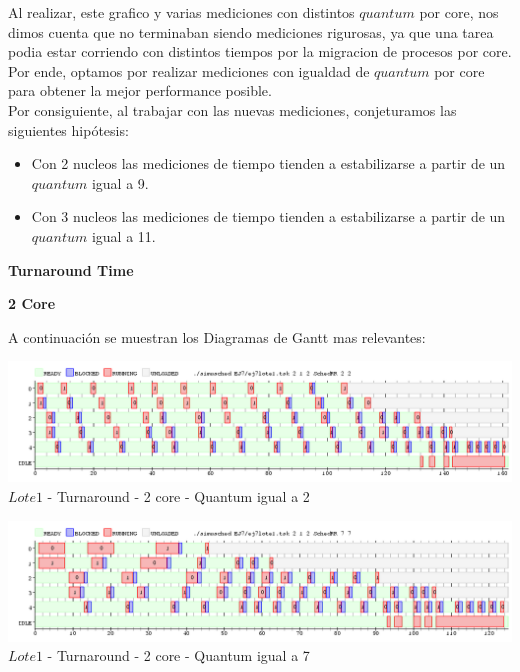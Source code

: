 \indent Al realizar, este grafico y varias mediciones con distintos $quantum$ por core, nos dimos cuenta que no terminaban
siendo mediciones rigurosas, ya que una tarea podia estar corriendo con distintos tiempos por la migracion de procesos por core.\\
\indent Por ende, optamos por realizar mediciones con igualdad de $quantum$ por core para obtener la mejor performance posible.\\
 
 \indent Por consiguiente, al trabajar con las nuevas mediciones, conjeturamos las siguientes hipótesis:
 
 \begin{itemize}
  \item Con 2 nucleos las mediciones de tiempo tienden a estabilizarse a partir de un $quantum$ igual a 9.
  \item Con 3 nucleos las mediciones de tiempo tienden a estabilizarse a partir de un $quantum$ igual a 11.
 \end{itemize}
 \begin{center}
 \textbf{Turnaround Time} 
  \end{center}

 \begin{center}
 \textbf{2 Core}
 \end{center}
  A continuación se muestran los Diagramas de Gantt mas relevantes:
  
  \begin{center}
    	\includegraphics[width=450pt]{./EJ7/ej7tour2core1quan.png}
	{$Lote 1$ - Turnaround - 2 core - Quantum igual a 2}	
 \end{center}

   \begin{center}
    	\includegraphics[width=450pt]{./EJ7/ej7tour2core3quan.png}
	{$Lote 1$ - Turnaround - 2 core - Quantum igual a 7}	
 \end{center}
 
